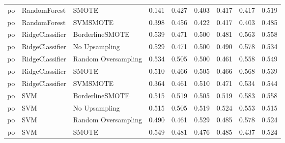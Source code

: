 \begin{tabular}{lllllllll}
      po &                 RandomForest &               SMOTE &     0.141 &                     0.427 &                 0.403 &                  0.417 &                                   0.417 &     0.519 \\
      po &                 RandomForest &            SVMSMOTE &     0.398 &                     0.456 &                 0.422 &                  0.417 &                                   0.403 &     0.485 \\
      po &              RidgeClassifier &     BorderlineSMOTE &     0.539 &                     0.471 &                 0.500 &                  0.481 &                                   0.563 &     0.558 \\
      po &              RidgeClassifier &       No Upsampling &     0.529 &                     0.471 &                 0.500 &                  0.490 &                                   0.578 &     0.534 \\
      po &              RidgeClassifier & Random Oversampling &     0.534 &                     0.505 &                 0.500 &                  0.461 &                                   0.558 &     0.549 \\
      po &              RidgeClassifier &               SMOTE &     0.510 &                     0.466 &                 0.505 &                  0.466 &                                   0.568 &     0.539 \\
      po &              RidgeClassifier &            SVMSMOTE &     0.364 &                     0.461 &                 0.510 &                  0.471 &                                   0.534 &     0.544 \\
      po &                          SVM &     BorderlineSMOTE &     0.515 &                     0.519 &                 0.505 &                  0.519 &                                   0.583 &     0.558 \\
      po &                          SVM &       No Upsampling &     0.515 &                     0.505 &                 0.519 &                  0.524 &                                   0.553 &     0.515 \\
      po &                          SVM & Random Oversampling &     0.490 &                     0.461 &                 0.529 &                  0.485 &                                   0.578 &     0.524 \\
      po &                          SVM &               SMOTE &     0.549 &                     0.481 &                 0.476 &                  0.485 &                                   0.437 &     0.524 \\

\end{tabular}
